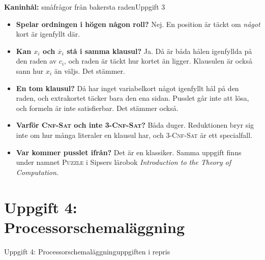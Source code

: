 \documentclass[aspectratio=169,10pt]{beamer}
\newcommand{\rabbit}{\textcolor{warnorange}{\textbf{Kaninhål:}} }
\newcommand{\prob}[1]{\textsc{#1}}
\newcommand{\xbar}[1]{\overline{x}_{#1}}
\begin{document}
\begin{frame}{\rabbit småfrågor från bakersta raden}{Uppgift 3}
  \begin{itemize}
    \item<1-> \textbf{Spelar ordningen i högen någon roll?} Nej. En position är täckt om \emph{något} kort är igenfyllt där.
    \item<2-> \textbf{Kan $x_i$ och $\xbar{i}$ stå i samma klausul?} Ja. Då är båda hålen igenfyllda på den raden av $c_i$, och raden är täckt hur kortet än ligger. Klausulen är också sann hur $x_i$ än väljs. Det stämmer.
    \item<3-> \textbf{En tom klausul?} Då har inget variabelkort något igenfyllt hål på den raden, och extrakortet täcker bara den ena sidan. Pusslet går inte att lösa, och formeln är inte satisfierbar. Det stämmer också.
    \item<4-> \textbf{Varför \prob{Cnf-Sat} och inte \prob{3-Cnf-Sat}?} Båda duger. Reduktionen bryr sig inte om hur många literaler en klausul har, och \prob{3-Cnf-Sat} är ett specialfall.
    \item<5-> \textbf{Var kommer pusslet ifrån?} Det är en klassiker. Samma uppgift finns under namnet \prob{Puzzle} i Sipsers lärobok \emph{Introduction to the Theory of Computation}.
  \end{itemize}
\end{frame}

\section{Uppgift 4: Processorschemaläggning}

\begin{frame}{Uppgift 4: Processorschemaläggning}{uppgiften i repris}
  \uppgiftFyra
\end{frame}
\end{document}
